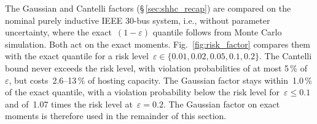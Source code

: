 The Gaussian and Cantelli factors (\S\,\ref{sec:shhc_recap}) are compared on the nominal purely inductive IEEE 30-bus system, i.e., without parameter uncertainty, where the exact~$(1-\varepsilon)$ quantile follows from Monte Carlo simulation. Both act on the exact moments. Fig.~\ref{fig:risk_factor} compares them with the exact quantile for a risk level~$\varepsilon \in \{0.01, 0.02, 0.05, 0.1, 0.2\}$. The Cantelli bound never exceeds the risk level, with violation probabilities of at most 5\,\% of~$\varepsilon$, but costs~2.6--13\,\% of hosting capacity. The Gaussian factor stays within~1.0\,\% of the exact quantile, with a violation probability below the risk level for~$\varepsilon \leq 0.1$ and of~1.07 times the risk level at~$\varepsilon = 0.2$. The Gaussian factor on exact moments is therefore used in the remainder of this section.


